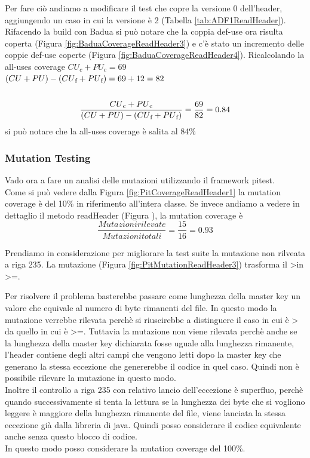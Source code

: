 \documentclass[12pt, a4paper]{article}
\begin{document}
Per fare ciò andiamo a modificare il test che copre la versione 0 dell'header, aggiungendo un caso in cui la versione
è 2 (Tabella \ref{tab:ADF1ReadHeader}).  Rifacendo la build con Badua si può notare che la coppia def-use ora risulta coperta (Figura \ref{fig:BaduaCoverageReadHeader3})
e c'è stato un incremento delle coppie def-use coperte (Figura \ref{fig:BaduaCoverageReadHeader4}). Ricalcolando
la all-uses coverage 
\(CU_c + PU_c = 69\) \\
\( (CU + PU) - (CU\textsubscript{f} + PU\textsubscript{f}) = 69 + 12 = 82\) \\ \\
\[\frac{{CU\textsubscript{c} + PU\textsubscript{c}}}{{(CU + PU) - (CU\textsubscript{f} + PU\textsubscript{f})}} = \frac{{69}}{{82}} = 0.84\]
si può notare che la all-uses coverage è salita al 84\% \\

\subsubsection{Mutation Testing}
Vado ora a fare un analisi delle mutazioni utilizzando il framework pitest. \\
Come si può vedere dalla Figura \ref{fig:PitCoverageReadHeader1} la mutation coverage è del 10\% in riferimento all'intera classe.
Se invece andiamo a vedere in dettaglio il metodo readHeader (Figura ), la mutation coverage è 
\[\frac{{Mutazioni rilevate}}{{Mutazioni totali}} = \frac{{15}}{{16}} = 0.93\]

Prendiamo in considerazione per migliorare la test suite la mutazione non rilveata a riga 235. 
La mutazione (Figura \ref{fig:PitMutationReadHeader3}) trasforma il \textgreater in \textgreater=.

Per risolvere il problema basterebbe passare come lunghezza della master key un valore che equivale al numero di byte rimanenti
del file. In questo modo la mutazione verrebbe rilevata perchè si riuscirebbe a distinguere il caso in cui è > da quello in cui
è >=. Tuttavia la mutazione non viene rilevata perchè anche se la lunghezza della master key dichiarata fosse uguale alla
lunghezza rimanente, l'header contiene degli altri campi che vengono letti dopo la master key che generano la stessa eccezione 
che genererebbe il codice in quel caso. Quindi non è possibile rilevare la mutazione in questo modo. \\
Inoltre il controllo a riga 235 con relativo lancio dell'eccezione è superfluo, perchè quando successivamente si tenta la lettura
se la lunghezza dei byte che si vogliono leggere è maggiore della lunghezza rimanente del file, viene lanciata la stessa eccezione
già dalla libreria di java. Quindi posso considerare il codice equivalente anche senza questo blocco di codice. \\
In questo modo posso considerare la mutation coverage del 100\%.
\end{document}
